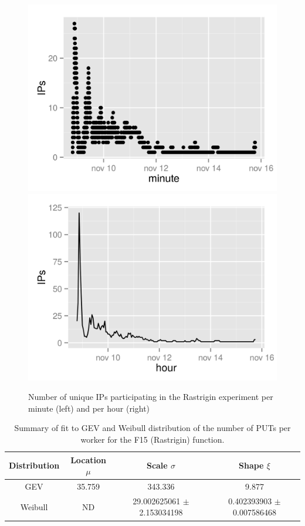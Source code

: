 \documentclass{sig-alternate}
\begin{document}
%
%
\begin{figure}[!htb]
\centering
\includegraphics[width=0.49\linewidth]{rastrigin-IPs.png}
\includegraphics[width=0.49\linewidth]{rastrigin-IPs-hour.png}
\caption{Number of unique IPs participating in the Rastrigin
  experiment per minute (left) and per hour (right)} 
\label{fig:ips:rastrigin}
\end{figure}
%
\begin{table}
\caption{Summary of fit to GEV and Weibull distribution of
  the number of PUTs per worker for the F15 (Rastrigin) function. \label{tab:puts:ww:f15}}
\begin{center}
\begin{tabular}{cccc}
\hline
Distribution & Location $\mu$ & Scale $\sigma$ & Shape $\xi$ \\
\hline
GEV & 35.759  &  343.336   & 9.877 \\
Weibull & ND & 29.002625061 $\pm$ 2.153034198  & 0.402393903 $\pm$ 0.007586468 \\
\hline
\end{tabular}
\end{center}
\end{table}
%
\end{document}
